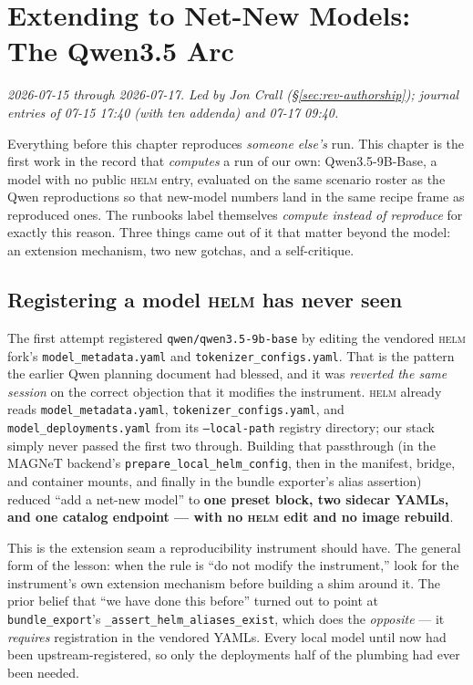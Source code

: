 \documentclass[11pt]{report}
\newcommand{\code}[1]{\texttt{#1}}
\begin{document}
\chapter{Extending to Net-New Models: The Qwen3.5 Arc}
\label{chap:qwen35}

\emph{2026-07-15 through 2026-07-17. Led by Jon Crall
(\S\ref{sec:rev-authorship}); journal entries of 07-15 17:40 (with ten addenda)
and 07-17 09:40.}

Everything before this chapter reproduces \emph{someone else's} run. This chapter is
the first work in the record that \emph{computes} a run of our own: Qwen3.5-9B-Base,
a model with no public \textsc{helm} entry, evaluated on the same scenario roster as
the Qwen reproductions so that new-model numbers land in the same recipe frame as
reproduced ones. The runbooks label themselves \emph{compute instead of reproduce}
for exactly this reason. Three things came out of it that matter beyond the model:
an extension mechanism, two new gotchas, and a self-critique.

\section{Registering a model \textsc{helm} has never seen}

The first attempt registered \code{qwen/qwen3.5-9b-base} by editing the vendored
\textsc{helm} fork's \code{model\_metadata.yaml} and \code{tokenizer\_configs.yaml}.
That is the pattern the earlier Qwen planning document had blessed, and it was
\emph{reverted the same session} on the correct objection that it modifies the
instrument. \textsc{helm} already reads \code{model\_metadata.yaml},
\code{tokenizer\_configs.yaml}, and \code{model\_deployments.yaml} from its
\code{--local-path} registry directory; our stack simply never passed the first two
through. Building that passthrough (in the MAGNeT backend's
\code{prepare\_local\_helm\_config}, then in the manifest, bridge, and container
mounts, and finally in the bundle exporter's alias assertion) reduced ``add a
net-new model'' to \textbf{one preset block, two sidecar YAMLs, and one catalog
endpoint --- with no \textsc{helm} edit and no image rebuild}.

This is the extension seam a reproducibility instrument should have. The general
form of the lesson: when the rule is ``do not modify the instrument,'' look for the
instrument's own extension mechanism before building a shim around it. The prior
belief that ``we have done this before'' turned out to point at
\code{bundle\_export}'s \code{\_assert\_helm\_aliases\_exist}, which does the
\emph{opposite} --- it \emph{requires} registration in the vendored YAMLs. Every
local model until now had been upstream-registered, so only the deployments half of
the plumbing had ever been needed.
\end{document}
